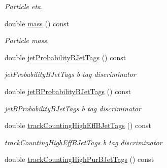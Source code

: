\begin{DoxyCompactItemize}
\begin{DoxyCompactList}\small\item\em Particle eta. \end{DoxyCompactList}\item 
\hypertarget{classran_1_1NtJet_a79d3419ba9701c4170f1dc4104b24867}{double \hyperlink{classran_1_1NtJet_a79d3419ba9701c4170f1dc4104b24867}{mass} () const }\label{classran_1_1NtJet_a79d3419ba9701c4170f1dc4104b24867}

\begin{DoxyCompactList}\small\item\em Particle mass. \end{DoxyCompactList}\item 
\hypertarget{classran_1_1NtJet_a48a59bb320e43ed9130bad31bac4bf37}{double \hyperlink{classran_1_1NtJet_a48a59bb320e43ed9130bad31bac4bf37}{jet\-Probability\-B\-Jet\-Tags} () const }\label{classran_1_1NtJet_a48a59bb320e43ed9130bad31bac4bf37}

\begin{DoxyCompactList}\small\item\em jet\-Probability\-B\-Jet\-Tags b tag discriminator \end{DoxyCompactList}\item 
\hypertarget{classran_1_1NtJet_af04bcd597fa9d1c124821e3db7ad3c4f}{double \hyperlink{classran_1_1NtJet_af04bcd597fa9d1c124821e3db7ad3c4f}{jet\-B\-Probability\-B\-Jet\-Tags} () const }\label{classran_1_1NtJet_af04bcd597fa9d1c124821e3db7ad3c4f}

\begin{DoxyCompactList}\small\item\em jet\-B\-Probability\-B\-Jet\-Tags b tag discriminator \end{DoxyCompactList}\item 
\hypertarget{classran_1_1NtJet_ade84ff4ae60e81b5029d7e18e49a9ef0}{double \hyperlink{classran_1_1NtJet_ade84ff4ae60e81b5029d7e18e49a9ef0}{track\-Counting\-High\-Eff\-B\-Jet\-Tags} () const }\label{classran_1_1NtJet_ade84ff4ae60e81b5029d7e18e49a9ef0}

\begin{DoxyCompactList}\small\item\em track\-Counting\-High\-Eff\-B\-Jet\-Tags b tag discriminator \end{DoxyCompactList}\item 
\hypertarget{classran_1_1NtJet_a0c608fa459cc69f38cb9bb869ab883c5}{double \hyperlink{classran_1_1NtJet_a0c608fa459cc69f38cb9bb869ab883c5}{track\-Counting\-High\-Pur\-B\-Jet\-Tags} () const }\label{classran_1_1NtJet_a0c608fa459cc69f38cb9bb869ab883c5}


\end{DoxyCompactItemize}
